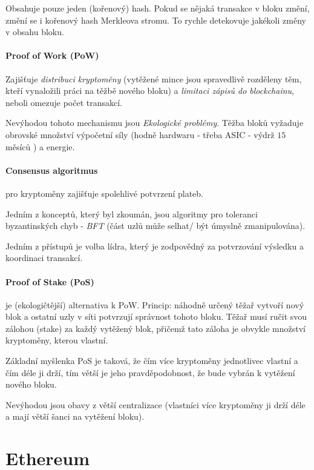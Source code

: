 \documentclass[10pt,a4paper]{article}
\begin{document}
Obsahuje pouze jeden (kořenový) hash. Pokud se nějaká transakce v bloku změní, změní se i kořenový hash Merkleova stromu. To rychle detekovuje jakékoli změny v obsahu bloku.

\paragraph{Proof of Work (PoW)} Zajišťuje \textit{distribuci kryptoměny} (vytěžené mince jsou spravedlivě rozděleny těm, kteří vynaložili práci na těžbě nového bloku) a \textit{limitaci zápisů do blockchainu}, neboli omezuje počet transakcí.

Nevýhodou tohoto mechanismu jsou \textit{Ekologické problémy}.
Těžba bloků vyžaduje obrovské množství výpočetní síly (hodně hardwaru - třeba ASIC - výdrž $ 15 $ měsíců ) a energie.




\paragraph{Consensus algoritmus} pro kryptoměny zajišťuje spolehlivé potvrzení plateb.

Jedním z konceptů, který byl zkoumán, jsou algoritmy pro toleranci byzantinských chyb - \textit{BFT} (část uzlů může selhat/ být úmyslně zmanipulována). 

Jedním z přístupů je volba lídra, který je zodpovědný za potvrzování výsledku a koordinaci transakcí.


\paragraph{Proof of Stake (PoS)} je (ekologičtější) alternativa k PoW. 
Princip: náhodně určený těžař vytvoří nový blok a ostatní uzly v síti potvrzují správnost tohoto bloku. 
Těžař musí ručit svou zálohou (stake) za každý vytěžený blok, přičemž tato záloha je obvykle množství kryptoměny, kterou vlastní.

Základní myšlenka PoS je taková, že čím více kryptoměny jednotlivec vlastní a čím déle ji drží, tím větší je jeho pravděpodobnost, že bude vybrán k vytěžení nového bloku. 

Nevýhodou jsou obavy z větší centralizace (vlastníci více kryptoměny ji drží déle a mají větší šanci na vytěžení bloku).

\section{Ethereum}
\end{document}
